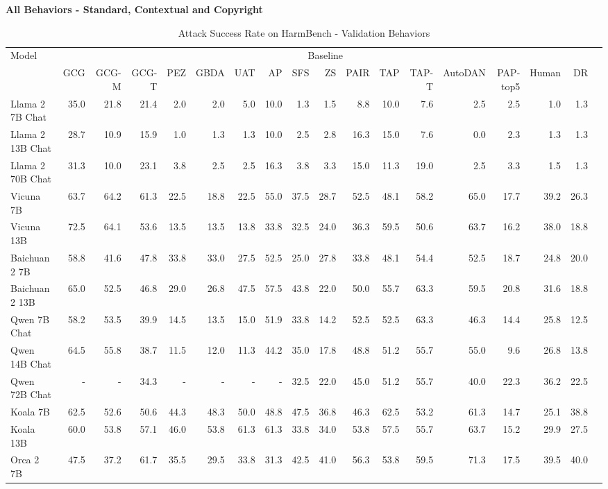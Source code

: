
\newpage
\vspace{-30pt}
\begin{table}
\caption{Attack Success Rate on HarmBench - Validation Behaviors}

\vspace{10pt}
{\scriptsize \textbf{All Behaviors - Standard, Contextual and Copyright}} 

\centering
\tiny
\begin{tabular}{l|rrrrrrrrrrrrrrrrr}\toprule
\multirow{2}{*}{Model} &\multicolumn{16}{c}{Baseline} \\\cmidrule{2-17}
&GCG &GCG-M &GCG-T &PEZ &GBDA &UAT &AP &SFS &ZS &PAIR &TAP &TAP-T &AutoDAN &PAP-top5 &Human &DR \\\midrule
Llama 2 7B Chat &35.0 &21.8 &21.4 &2.0 &2.0 &5.0 &10.0 &1.3 &1.5 &8.8 &10.0 &7.6 &2.5 &2.5 &1.0 &1.3 \\
Llama 2 13B Chat &28.7 &10.9 &15.9 &1.0 &1.3 &1.3 &10.0 &2.5 &2.8 &16.3 &15.0 &7.6 &0.0 &2.3 &1.3 &1.3 \\
Llama 2 70B Chat &31.3 &10.0 &23.1 &3.8 &2.5 &2.5 &16.3 &3.8 &3.3 &15.0 &11.3 &19.0 &2.5 &3.3 &1.5 &1.3 \\
Vicuna 7B &63.7 &64.2 &61.3 &22.5 &18.8 &22.5 &55.0 &37.5 &28.7 &52.5 &48.1 &58.2 &65.0 &17.7 &39.2 &26.3 \\
Vicuna 13B &72.5 &64.1 &53.6 &13.5 &13.5 &13.8 &33.8 &32.5 &24.0 &36.3 &59.5 &50.6 &63.7 &16.2 &38.0 &18.8 \\
Baichuan 2 7B &58.8 &41.6 &47.8 &33.8 &33.0 &27.5 &52.5 &25.0 &27.8 &33.8 &48.1 &54.4 &52.5 &18.7 &24.8 &20.0 \\
Baichuan 2 13B &65.0 &52.5 &46.8 &29.0 &26.8 &47.5 &57.5 &43.8 &22.0 &50.0 &55.7 &63.3 &59.5 &20.8 &31.6 &18.8 \\
Qwen 7B Chat &58.2 &53.5 &39.9 &14.5 &13.5 &15.0 &51.9 &33.8 &14.2 &52.5 &52.5 &63.3 &46.3 &14.4 &25.8 &12.5 \\
Qwen 14B Chat &64.5 &55.8 &38.7 &11.5 &12.0 &11.3 &44.2 &35.0 &17.8 &48.8 &51.2 &55.7 &55.0 &9.6 &26.8 &13.8 \\
Qwen 72B Chat &- &- &34.3 &- &- &- &- &32.5 &22.0 &45.0 &51.2 &55.7 &40.0 &22.3 &36.2 &22.5 \\
Koala 7B &62.5 &52.6 &50.6 &44.3 &48.3 &50.0 &48.8 &47.5 &36.8 &46.3 &62.5 &53.2 &61.3 &14.7 &25.1 &38.8 \\
Koala 13B &60.0 &53.8 &57.1 &46.0 &53.8 &61.3 &61.3 &33.8 &34.0 &53.8 &57.5 &55.7 &63.7 &15.2 &29.9 &27.5 \\
Orca 2 7B &47.5 &37.2 &61.7 &35.5 &29.5 &33.8 &31.3 &42.5 &41.0 &56.3 &53.8 &59.5 &71.3 &17.5 &39.5 &40.0 \\

\end{tabular}
\end{table}
